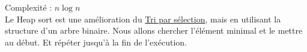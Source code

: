 \label{heapSort}
\footnotesize 
\noindent
Complexité :  $ n\log n$
\\
\normalsize
Le Heap sort est une amélioration du \href{https://www.geeksforgeeks.org/selection-sort/}{Tri par sélection}, mais en utilisant la structure d'un arbre binaire. Nous allons chercher l'élément minimal et le mettre au début. Et répéter jusqu'à la fin de l'exécution.